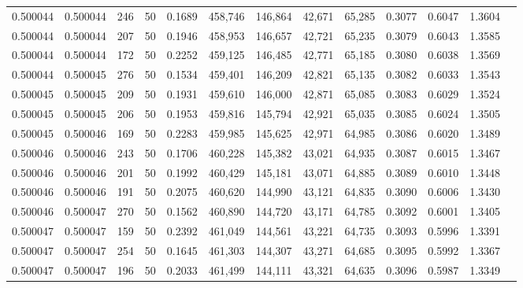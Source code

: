 \begin{tabular}{rrrrrrrrrrrrr}
0.500044 & 0.500044 &   246 &  50 &                                     0.1689 & 458,746 & 146,864 &  42,671 &  65,285 & 0.3077 & 0.6047 & 1.3604 \\
0.500044 & 0.500044 &   207 &  50 &                                     0.1946 & 458,953 & 146,657 &  42,721 &  65,235 & 0.3079 & 0.6043 & 1.3585 \\
0.500044 & 0.500044 &   172 &  50 &                                     0.2252 & 459,125 & 146,485 &  42,771 &  65,185 & 0.3080 & 0.6038 & 1.3569 \\
0.500044 & 0.500045 &   276 &  50 &                                     0.1534 & 459,401 & 146,209 &  42,821 &  65,135 & 0.3082 & 0.6033 & 1.3543 \\
0.500045 & 0.500045 &   209 &  50 &                                     0.1931 & 459,610 & 146,000 &  42,871 &  65,085 & 0.3083 & 0.6029 & 1.3524 \\
0.500045 & 0.500045 &   206 &  50 &                                     0.1953 & 459,816 & 145,794 &  42,921 &  65,035 & 0.3085 & 0.6024 & 1.3505 \\
0.500045 & 0.500046 &   169 &  50 &                                     0.2283 & 459,985 & 145,625 &  42,971 &  64,985 & 0.3086 & 0.6020 & 1.3489 \\
0.500046 & 0.500046 &   243 &  50 &                                     0.1706 & 460,228 & 145,382 &  43,021 &  64,935 & 0.3087 & 0.6015 & 1.3467 \\
0.500046 & 0.500046 &   201 &  50 &                                     0.1992 & 460,429 & 145,181 &  43,071 &  64,885 & 0.3089 & 0.6010 & 1.3448 \\
0.500046 & 0.500046 &   191 &  50 &                                     0.2075 & 460,620 & 144,990 &  43,121 &  64,835 & 0.3090 & 0.6006 & 1.3430 \\
0.500046 & 0.500047 &   270 &  50 &                                     0.1562 & 460,890 & 144,720 &  43,171 &  64,785 & 0.3092 & 0.6001 & 1.3405 \\
0.500047 & 0.500047 &   159 &  50 &                                     0.2392 & 461,049 & 144,561 &  43,221 &  64,735 & 0.3093 & 0.5996 & 1.3391 \\
0.500047 & 0.500047 &   254 &  50 &                                     0.1645 & 461,303 & 144,307 &  43,271 &  64,685 & 0.3095 & 0.5992 & 1.3367 \\
0.500047 & 0.500047 &   196 &  50 &                                     0.2033 & 461,499 & 144,111 &  43,321 &  64,635 & 0.3096 & 0.5987 & 1.3349 \\

\end{tabular}
